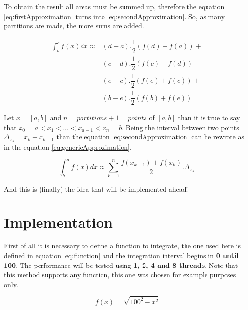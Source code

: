 	\par To obtain the result all areas must be summed up, therefore the equation \ref{eq:firstApproximation} turns into \ref{eq:secondApproximation}. So, as many partitions are made, the more sums are added.\newline
	
	\begin{equation}
		\begin{aligned}
			\int^a_b{f(x) dx} \approx 
			&(d-a).\dfrac{1}{2}(f(d)+f(a))+\\
			&(c-d).\dfrac{1}{2}(f(c)+f(d))+\\
			&(e-c).\dfrac{1}{2}(f(e)+f(c))+\\
			&(b-e).\dfrac{1}{2}(f(b)+f(e))
		\end{aligned}
		\label{eq:secondApproximation}
	\end{equation}

	\par Let $x = [a,b]$ and $n=partitions+1=points$ of $[a,b]$ than it is true to say that $x_0 = a < x_1 < ... < x_{n-1} < x_n = b$. Being the interval between two points $\Delta_{x_k} = x_k - x_{k-1}$ than the equation \ref*{eq:secondApproximation} can be rewrote as in the equation \ref{eq:genericApproximation}.\newline
	
	\begin{equation}
		\int^a_b{f(x) dx} \approx \sum_{k=1}^{n} \dfrac{f(x_{k-1})+f(x_k)}{2} . \Delta_{x_k}
		\label{eq:genericApproximation}
	\end{equation}

	\par And this is (finally) the idea that will be implemented ahead!
	
	\section{Implementation}
		\par First of all it is necessary to define a function to integrate, the one used here is defined in equation \ref{eq:function} and the integration interval begins in \textbf{0 until 100}. The performance will be tested using \textbf{1, 2, 4 and 8 threads}.  Note that this method supports any function, this one was chosen for example purposes only.\newline
		
		\begin{equation}
			f(x) = \sqrt{100^2 - x^2}
			\label{eq:function}
		\end{equation}		
		
